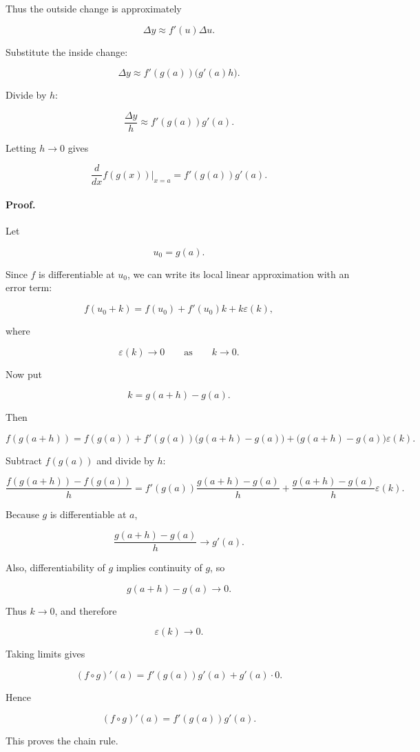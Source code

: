 Thus the outside change is approximately

\[
\Delta y \approx f'(u)\Delta u.
\]

Substitute the inside change:

\[
\Delta y
\approx
f'(g(a))\bigl(g'(a)h\bigr).
\]

Divide by \(h\):

\[
\frac{\Delta y}{h}
\approx
f'(g(a))g'(a).
\]

Letting \(h\to0\) gives

\[
\frac{d}{dx}f(g(x))\bigg|_{x=a}
=
f'(g(a))g'(a).
\]

\paragraph{Proof.}
Let

\[
u_0=g(a).
\]

Since \(f\) is differentiable at \(u_0\), we can write its local linear approximation with an error term:

\[
f(u_0+k)
=
f(u_0)+f'(u_0)k+k\varepsilon(k),
\]

where

\[
\varepsilon(k)\to0
\qquad\text{as}\qquad
k\to0.
\]

Now put

\[
k=g(a+h)-g(a).
\]

Then

\[
f(g(a+h))
=
f(g(a))+f'(g(a))\bigl(g(a+h)-g(a)\bigr)
+
\bigl(g(a+h)-g(a)\bigr)\varepsilon(k).
\]

Subtract \(f(g(a))\) and divide by \(h\):

\[
\frac{f(g(a+h))-f(g(a))}{h}
=
f'(g(a))\frac{g(a+h)-g(a)}{h}
+
\frac{g(a+h)-g(a)}{h}\varepsilon(k).
\]

Because \(g\) is differentiable at \(a\),

\[
\frac{g(a+h)-g(a)}{h}\to g'(a).
\]

Also, differentiability of \(g\) implies continuity of \(g\), so

\[
g(a+h)-g(a)\to0.
\]

Thus \(k\to0\), and therefore

\[
\varepsilon(k)\to0.
\]

Taking limits gives

\[
(f\circ g)'(a)
=
f'(g(a))g'(a)+g'(a)\cdot0.
\]

Hence

\[
\boxed{
(f\circ g)'(a)=f'(g(a))g'(a).
}
\]

This proves the chain rule.

